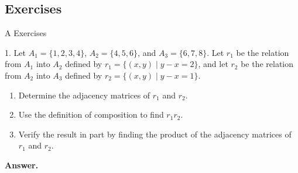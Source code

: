 \documentclass[10pt,]{book}
\theoremstyle{plain}
\theoremstyle{definition}
\theoremstyle{definition}
\theoremstyle{definition}
\theoremstyle{definition}
\begin{document}
\subsection[Exercises]{Exercises}\label{exercises-6-4}
\hypertarget{exercisegroup-8}{}\typeout{************************************************}
\typeout{************************************************}
A Exercises%
\begin{exercisegroup}
\item[1.]\hypertarget{exercise-25}{}Let \(A_1 = \{1,2, 3, 4\}\), \(A_2 = \{4, 5, 6\}\), and \(A_3 = \{6, 7, 8\}\). Let \(r_1\) be the relation from \(A_1\) into \(A_2\) defined by
\(r_1 = \{(x, y)  \mid  y - x = 2\}\), and let \(r_2\) be the relation from \(A_2\) into \(A_3\) defined by \(r_2 = \{(x, y) \mid  y - x = 1\}\).%
\par
\leavevmode%
\begin{enumerate}[label=\alph*]
\item\hypertarget{li-93}{} Determine the adjacency matrices of \(r_1\) and \(r_2\).%
\item\hypertarget{li-94}{} Use the definition of composition to find \(r_1r_2\).%
\item\hypertarget{li-95}{} Verify the result in part by finding the product of the adjacency matrices of \(r_1\) and \(r_2\).%
\end{enumerate}
%
\par\smallskip
\par\smallskip
\noindent\textbf{Answer.}\hypertarget{answer-13}{}\quad
\leavevmode%
\end{exercisegroup}
\end{document}
